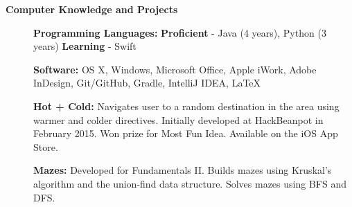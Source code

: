 \documentclass[letterpaper,10.6pt]{article}
\newcommand{\resheading}[1]{{\large \colorbox{mygrey}{\begin{minipage}{\textwidth}{\textbf{#1 \vphantom{p\^{E}}}}\end{minipage}}}}
\begin{document}
\resheading{Computer Knowledge and Projects}
{\small
\begin{description}
	\item[] \hspace{0.03in} \textbf{Programming Languages:} {\footnotesize \textbf{Proficient} - Java (4 years), Python (3 years) \enspace \textbf{Learning} - Swift}
	\item[] \hspace{0.03in} \textbf{Software:} {\footnotesize OS X, Windows, Microsoft Office, Apple iWork, Adobe InDesign, Git/GitHub, Gradle, IntelliJ IDEA, \LaTeX}
	\item[] \hspace{0.03in} \textbf{Hot + Cold:} {\footnotesize Navigates user to a random destination in the area using warmer and colder directives. Initially developed at HackBeanpot in February 2015. Won prize for Most Fun Idea. Available on the iOS App Store.}
	\item[] \hspace{0.03in} \textbf{Mazes:} {\footnotesize Developed for Fundamentals II. Builds mazes using Kruskal's algorithm and the union-find data structure. Solves mazes using BFS and DFS.}
	
\end{description}
}
\end{document}
